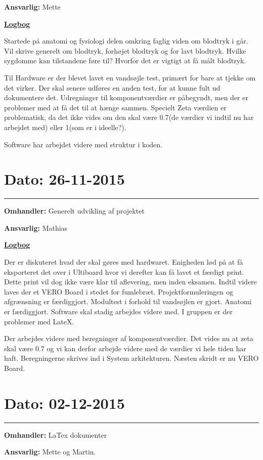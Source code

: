 \textbf{Ansvarlig:} Mette

\underline{\textbf{Logbog}}

Startede på anatomi og fysiologi delen omkring faglig viden om blodtryk i går. Vil skrive generelt om blodtryk, forhøjet blodtryk og for lavt blodtryk. Hvilke sygdomme kan tilstandene føre til? Hvorfor det er vigtigt at få målt blodtryk. 

Til Hardware er der blevet lavet en vandsøjle test, primært for bare at tjekke om det virker. Der skal senere udføres en anden test, for at kunne fult ud dokumentere det. 
Udregninger til komponentværdier er påbegyndt, men der er problemer med at få det til at hænge sammen. Specielt Zeta værdien er problematisk, da det ikke vides om den skal være 0.7(de værdier vi indtil nu har arbejdet med) eller 1(som er i ideelle?). 

Software har arbejdet videre med struktur i koden.  
\\
\section{Dato: 26-11-2015}
\hrule
\textbf{Omhandler:} Generelt udvikling af projektet

\textbf{Ansvarlig:} Mathias

\underline{\textbf{Logbog}}

Der er diskuteret hvad der skal gøres med hardwaret. Enigheden lød på at få eksporteret det over i Ultiboard hvor vi derefter kan få lavet et færdigt print. Dette print vil dog ikke være klar til aflevering, men inden eksamen. Indtil videre laves der et VERO Board i stedet for fumlebræt.
Projektformuleringen og afgrænsning er færdiggjort. Modultest i forhold til vandsøjlen er gjort. Anatomi er færdiggjort. Software skal stadig arbejdes videre med. I gruppen er der problemer med LateX.

Der arbejdes videre med beregninger af komponentværdier. Det vides nu at zeta skal være 0.7 og vi kan derfor arbejde videre med de værdier vi hele tiden har haft. Beregningerne skrives ind i System arkitekturen. Næsten skridt er nu VERO Board.  
\\

\section{Dato: 02-12-2015}
\hrule
\textbf{Omhandler:} LaTex dokumenter

\textbf{Ansvarlig:} Mette og Martin. 

